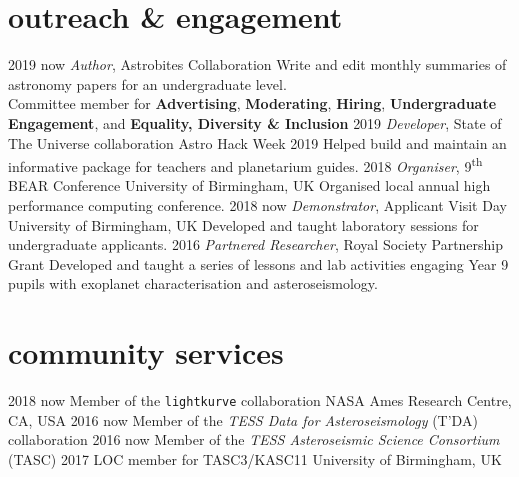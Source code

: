 \documentclass[]{k-cv} %
\begin{document}
\section{outreach \& engagement}
\begin{entrylist}
\centry
{2019 \to now}
{\emph{Author}, Astrobites Collaboration}
{}
{Write and edit monthly summaries of astronomy papers for an undergraduate level. \\ Committee member for \textbf{Advertising}, \textbf{Moderating}, \textbf{Hiring}, \textbf{Undergraduate Engagement}, and \textbf{Equality, Diversity \& Inclusion}}
\centry
{2019}
{\emph{Developer}, State of The Universe collaboration}
{Astro Hack Week 2019}
{Helped build and maintain an informative package for teachers and planetarium guides.}
\centry
{2018 }
{\emph{Organiser}, 9\textsuperscript{th} BEAR Conference}
{University of Birmingham, UK}
{Organised local annual high performance computing conference.}
\centry
{2018 \to now}
{\emph{Demonstrator}, Applicant Visit Day}
{University of Birmingham, UK}
{Developed and taught laboratory sessions for undergraduate applicants.}
\centry
{2016 }
{\emph{Partnered Researcher}, Royal Society Partnership Grant}
{}
{Developed and taught a series of lessons and lab activities engaging Year 9 pupils with exoplanet characterisation and asteroseismology.}
\end{entrylist}

\clearpage
{}

\section{community services}
\begin{entrylist}
\centrythree
{2018 \to now}
{Member of the \texttt{lightkurve} collaboration}
{NASA Ames Research Centre, CA, USA}
\centrythree
{2016 \to now}
{Member of the \emph{TESS Data for Asteroseismology} (T'DA) collaboration }
{}
\centrythree
{2016 \to now}
{Member of the \emph{TESS Asteroseismic Science Consortium} (TASC)}
{}
\centrythree
{2017}
{LOC member for TASC3/KASC11}
{University of Birmingham, UK}
\end{entrylist}
\end{document}
